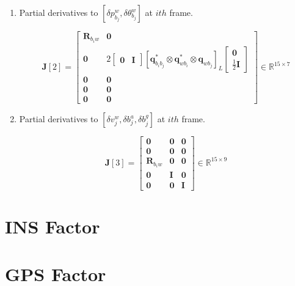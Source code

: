 \documentclass[12pt]{report}   %
\begin{document}
\begin{enumerate}
	\item Partial derivatives to {\color{blue}$[\delta p^{w}_{b_{j}},\delta \theta ^{w}_{b_{j}}]$} at $ith$ frame.
	
	\begin{equation}
	\mathbf{J}[2]=
	\begin{bmatrix}
	\mathbf{R}_{b_{i} w} & \mathbf{0} \\
	\mathbf{0} & 2\left[\begin{array}{ll}{\mathbf{0}} & {\mathbf{I}}\end{array}\right]\left[\mathbf{q}_{b_{i} b_{j}}^{*} \otimes \mathbf{q}_{w b_{i}}^{*} \otimes \mathbf{q}_{w b_{j}}\right]_{L}\left[\begin{array}{c}{\mathbf{0}} \\ {\frac{1}{2} \mathbf{I}}\end{array}\right] \\
	\mathbf{0} & \mathbf{0} \\
	\mathbf{0} & \mathbf{0}  \\
	\mathbf{0} & \mathbf{0}   
	\end{bmatrix}
	\in \mathbb{R}^{15 \times 7}
	\end{equation}
	
	\item Partial derivatives to {\color{blue}$[\delta v^{w}_{j},\delta b^a_{j},\delta b^g_{j}]$} at $ith$ frame.
	
	\begin{equation}
	\mathbf{J}[3]=
	\begin{bmatrix}
	\mathbf{0} & \mathbf{0} & \mathbf{0} \\
	\mathbf{0} & \mathbf{0} & \mathbf{0} \\
	\mathbf{R}_{b_{i} w} & \mathbf{0} & \mathbf{0} \\
	\mathbf{0} & \mathbf{I} & \mathbf{0} \\
	\mathbf{0} & \mathbf{0} & \mathbf{I}
	\end{bmatrix}
	\in \mathbb{R}^{15 \times 9}
	\end{equation}
	
\end{enumerate}



\section{INS Factor}




\section{GPS Factor}
\end{document}
